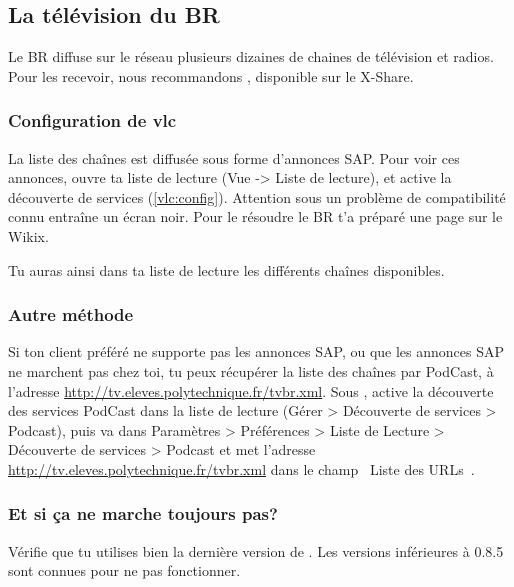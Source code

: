 
\subsection{La t\'el\'evision du BR}
\label{TV}

Le BR diffuse sur le r\'eseau plusieurs dizaines de chaines de t\'el\'evision et radios. Pour les recevoir, nous recommandons , disponible sur le X-Share.

\subsubsection{Configuration de vlc}

La liste des cha\^ines est diffus\'ee sous forme d'annonces SAP. Pour voir ces annonces, ouvre ta liste de lecture (Vue -> Liste de lecture), et active la d\'ecouverte de services (\ref{vlc:config}).
Attention sous  un probl\`eme de compatibilit\'e connu entra\^ine un \'ecran noir. Pour le r\'esoudre le BR t'a pr\'epar\'e une page sur le Wikix.

\label{vlc:config}

Tu auras ainsi dans ta liste de lecture les diff\'erents cha\^{i}nes disponibles.

\subsubsection{Autre m\'ethode}

Si ton client pr\'ef\'er\'e ne supporte pas les annonces SAP, ou que les annonces SAP ne marchent pas chez toi, tu peux r\'ecup\'erer la liste des cha\^ines par
PodCast, à l'adresse \url{http://tv.eleves.polytechnique.fr/tvbr.xml}. Sous , active la d\'ecouverte des services PodCast dans la liste de
lecture (G\'erer > D\'ecouverte de services > Podcast), puis va dans Param\`etres > Pr\'ef\'erences > Liste de Lecture > D\'ecouverte de services > Podcast et
met l'adresse \url{http://tv.eleves.polytechnique.fr/tvbr.xml} dans le champ \guillemotleft~Liste des URLs~\guillemotright .

\subsubsection{Et si ça ne marche toujours pas?}

V\'erifie que tu utilises bien la derni\`ere version de . Les versions inf\'erieures à 0.8.5 sont connues pour ne pas fonctionner.

